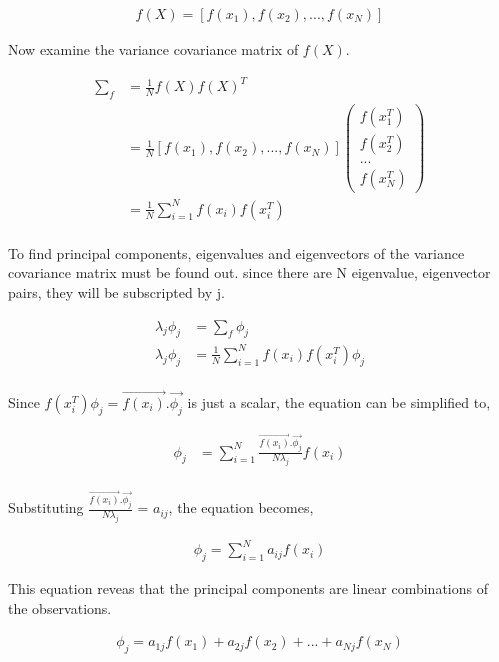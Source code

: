 \documentclass[11pt, a4paper]{article}
\begin{document}
\begin{align*}
	f(X) = [f(x_1), f(x_2), ..., f(x_N)] 
\end{align*}

Now examine the variance covariance matrix of $f(X)$.

\begin{align*}
	\sum_f & = \frac{1}{N}f(X)f(X)^T                                   \\
	       & = \frac{1}{N}[f(x_1), f(x_2), ..., f(x_N)]\begin{pmatrix} 
	f(x_1^T) \\
	f(x_2^T) \\
	... \\
	f(x_N^T) 
	\end{pmatrix} \\
	       & = \frac{1}{N} \sum_{i = 1}^{N} f(x_i)f(x_i^T)             \\
\end{align*}

To find principal components, eigenvalues and eigenvectors of the variance covariance matrix must be found out. since there are N eigenvalue, eigenvector pairs, they will be subscripted by j.

\begin{align*}
	\lambda_j\phi_j & = \sum_f\phi_j                                      \\
	\lambda_j\phi_j & = \frac{1}{N} \sum_{i = 1}^{N} f(x_i)f(x_i^T)\phi_j \\
\end{align*}

Since $f(x_i^T)\phi_j = \vec{f(x_i)}.\vec{\phi_j}$ is just a scalar, the equation can be simplified to,

\begin{align*}
	\phi_j & = \sum_{i = 1}^{N} \frac{\vec{f(x_i)}.\vec{\phi_j}}{N\lambda_j}f(x_i) \\
\end{align*}

Substituting $\frac{\vec{f(x_i)}.\vec{\phi_j}}{N\lambda_j}$ = $a_{ij}$, the equation becomes,

\begin{align*}
	\phi_j = \sum_{i = 1}^{N} a_{ij} f(x_i) 
\end{align*} 

This equation reveas that the principal components are linear combinations of the observations.

\begin{align*}
	\phi_j = a_{1j}f(x_1) + a_{2j}f(x_2) + ... + a_{Nj}f(x_N) \\ 
\end{align*}
\end{document}
